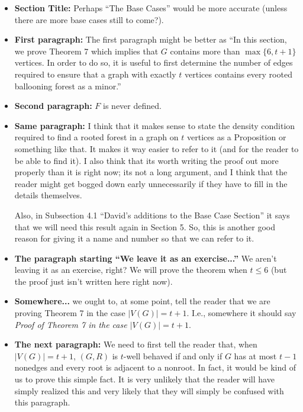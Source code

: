 \documentclass[11 pt]{article}
\begin{document}
\begin{itemize}
\item\textbf{Section Title:} Perhaps ``The Base Cases'' would be more accurate (unless there are more base cases still to come?). 
\item \textbf{First paragraph:} The first paragraph might be better as ``In this section, we prove Theorem 7 which implies that $G$ contains more than $\max\{6,t+1\}$ vertices. In order to do so, it is useful to first determine the number of edges required to ensure that a graph with exactly $t$ vertices contains every rooted ballooning forest as a minor.'' 
\item \textbf{Second paragraph:} $F$ is never defined. 
\item\textbf{Same paragraph:} I think that it makes sense to state the density condition required to find a rooted forest in a graph on $t$ vertices as a Proposition or something like that. It makes it way easier to refer to it (and for the reader to be able to find it). I also think that its worth writing the proof out more properly than it is right now; its not a long argument, and I think that the reader might get bogged down early unnecessarily if they have to fill in the details themselves.

Also, in Subsection 4.1 ``David's additions to the Base Case Section'' it says that we will need this result again in Section 5. So, this is another good reason for giving it a name and number so that we can refer to it. 
\item \textbf{The paragraph starting ``We leave it as an exercise...''} We aren't leaving it as an exercise, right? We will prove the theorem when $t\leq 6$ (but the proof just isn't written here right now). 
\item \textbf{Somewhere...} we ought to, at some point, tell the reader that we are proving Theorem 7 in the case $|V(G)|=t+1$. I.e., somewhere it should say \emph{Proof of Theorem 7 in the case $|V(G)|=t+1$}. 
\item \textbf{The next paragraph:} We need to first tell the reader that, when $|V(G)|=t+1$, $(G,R)$ is $t$-well behaved if and only if $G$ has at most $t-1$ nonedges and every root is adjacent to a nonroot. In fact, it would be kind of us to prove this simple fact. It is very unlikely that the reader will have simply realized this and very likely that they will simply be confused with this paragraph. 


\end{itemize}
\end{document}
